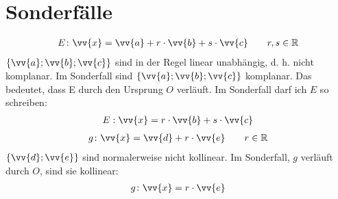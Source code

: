 \section{Sonderfälle}
\begin{gather*}
  E \colon \vv{x} = \vv{a} + r \cdot \vv{b} + s \cdot \vv{c} \qquad r, s \in \mathbb{R}
\end{gather*}
$\{\vv{a}; \vv{b}; \vv{c}\}$ sind in der Regel linear unabhängig, d. h. nicht komplanar. Im Sonderfall sind $\{\vv{a}; \vv{b}; \vv{c}\}$ komplanar. Das bedeutet, dass E durch den Ursprung $O$ verläuft. Im Sonderfall darf ich $E$ so schreiben:
\begin{gather*}
  E: \vv{x} = r \cdot \vv{b} + s \cdot \vv{c}
\end{gather*}
\begin{gather*}
  g \colon \vv{x} = \vv{d} + r \cdot \vv{e} \qquad r \in \mathbb{R}
\end{gather*}
$\{\vv{d}; \vv{e}\}$ sind normalerweise nicht kollinear. Im Sonderfall, $g$ verläuft durch $O$, sind sie kollinear:
\begin{gather*}
  g \colon \vv{x} = r \cdot \vv{e}
\end{gather*}
